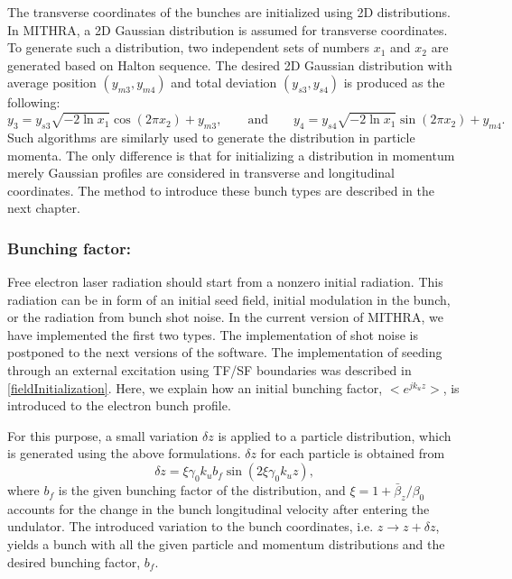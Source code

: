 The transverse coordinates of the bunches are initialized using 2D distributions.
%
In MITHRA, a 2D Gaussian distribution is assumed for transverse coordinates.
%
To generate such a distribution, two independent sets of numbers $x_1$ and $x_2$ are generated based on Halton sequence.
%
The desired 2D Gaussian distribution with average position $(y_{m3},y_{m4})$ and total deviation $(y_{s3},y_{s4})$ is produced as the following: %
%
\begin{equation}
\label{gaussian2D}
\displaystyle y_3 = y_{s3} \sqrt{-2 \ln x_1} \cos(2\pi x_2) + y_{m3}, \qquad \mathrm{and} \qquad
\displaystyle y_4 = y_{s4} \sqrt{-2 \ln x_1} \sin(2\pi x_2) + y_{m4}.
\end{equation}
%
Such algorithms are similarly used to generate the distribution in particle momenta.
%
The only difference is that for initializing a distribution in momentum merely Gaussian profiles are considered in transverse and longitudinal coordinates.
%
The method to introduce these bunch types are described in the next chapter.

\subsubsection{Bunching factor:}

Free electron laser radiation should start from a nonzero initial radiation.
%
This radiation can be in form of an initial seed field, initial modulation in the bunch, or the radiation from bunch shot noise.
%
In the current version of MITHRA, we have implemented the first two types.
%
The implementation of shot noise is postponed to the next versions of the software.
%
The implementation of seeding through an external excitation using TF/SF boundaries was described in \ref{fieldInitialization}.
%
Here, we explain how an initial bunching factor, $<e^{jk_uz}>$, is introduced to the electron bunch profile.

For this purpose, a small variation $\delta z$ is applied to a particle distribution, which is generated using the above formulations.
%
$\delta z$ for each particle is obtained from
%
\begin{equation}
\label{bunchingFactor}
\delta z = \xi \gamma_0 k_u b_f \sin (2 \xi \gamma_0 k_u z),
\end{equation}
%
where $b_f$ is the given bunching factor of the distribution, and $\xi=1+\bar{\beta}_z/\beta_0$ accounts for the change in the bunch longitudinal velocity after entering the undulator.
%
The introduced variation to the bunch coordinates, i.e. $z \rightarrow z+\delta z$, yields a bunch with all the given particle and momentum distributions and the desired bunching factor, $b_f$.

